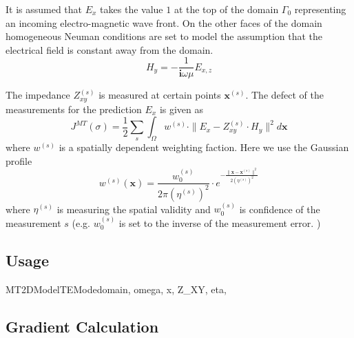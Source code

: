 It is assumed that $E_x$ takes the value $1$ at the top of the domain $\Gamma_0$ representing an incoming 
electro-magnetic wave front. On the other faces of the domain homogeneous Neuman conditions 
are set to model the assumption that the electrical field is constant away from the domain.
\begin{equation}\label{ref:2DMTTE:EQU:4}
H_y = - \frac{1}{\mathbf{i} \omega \mu} E_{x,z}
\end{equation}

The impedance $Z_{xy}^{(s)}$ is measured at certain points ${\mathbf x}^{(s)}$. The defect 
of the measurements for the prediction $E_x$ is given as 
\begin{equation}\label{ref:2DMTTE:EQU:5}
J^{MT}(\sigma) = \frac{1}{2}\sum_{s} \int_{\Omega}
w^{(s)} \cdot \| E_x - Z_{xy}^{(s)} \cdot H_y \|^2 d{\mathbf x}
\end{equation} 
where $w^{(s)}$ is a spatially dependent weighting faction. Here we use the Gaussian profile 
\begin{equation}\label{ref:2DMTTE:EQU:6}
w^{(s)}({\mathbf x}) = \frac{w^{(s)}_0}{2\pi (\eta^{(s)})^2} \cdot e^{-\frac{\|{\mathbf x} - {\mathbf x}^{(s)} \|^2}{2(\eta^{(s)})^2}}
\end{equation} 
where $\eta^{(s)}$ is measuring the spatial validity 
and $w^{(s)}_0$ is confidence of the measurement $s$ (e.g. $w^{(s)}_0$ is set to the inverse of the measurement error. )

\subsection{Usage}

\begin{classdesc}{MT2DModelTEMode}{domain, omega, x, Z_XY, eta,
}
\end{classdesc}

\subsection{Gradient Calculation}


